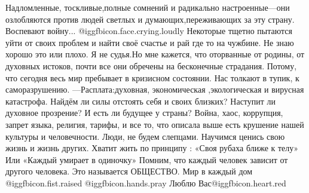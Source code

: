 
\obeycr
 Надломленные, тоскливые,полные сомнений  и радикально настроенные—они озлобляются  против людей  светлых и думающих,переживающих за  эту страну.  Воспевают войну... @igg{fbicon.face.crying.loudly} 
Некоторые тщетно пытаются уйти от своих проблем и найти своё счастье и рай где то на чужбине. Не знаю хорошо это или плохо. 
Я не судья.Но мне кажется, что оторванные от родины, от духовных истоков, почти все они обречены на бесконечные страдания.
Потому, что сегодня  весь мир пребывает в кризисном состоянии. 
Нас толкают в тупик, к саморазрушению. 
—Расплата:духовная, экономическая ,экологическая и  
вирусная  катастрофа.
Найдём ли силы отстоять себя и своих близких? 
Наступит ли духовное прозрение? И есть ли будущее у  страны?
 Война, хаос, коррупция, запрет языка, религия, тарифы, и  все то, что описала выше есть крушение нашей культуры и человечности.
Люди, не будем слепцами. Научимся ценись свою жизнь и жизнь других. Хватит  жить по принципу : «Своя рубаха ближе к телу»
 Или «Каждый умирает в одиночку»
 Помним, что каждый человек зависит от другого человека.
Это называется ОБЩЕСТВО. Мир в каждый дом @igg{fbicon.fist.raised}  @igg{fbicon.hands.pray} Люблю Вас@igg{fbicon.heart.red}
\restorecr
